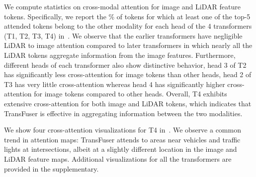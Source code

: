 We compute statistics on cross-modal attention for image and LiDAR feature tokens. Specifically, we report the \% of tokens for which at least one of the top-5 attended tokens belong to the other modality for each head of the 4 transformers (T1, T2, T3, T4) in~. We observe that the earlier transformers have negligible LiDAR to image attention compared to later transformers in which nearly all the LiDAR tokens aggregate information from the image features. Furthermore, different heads of each transformer also show distinctive behavior, \eg head 3 of T2 has significantly less cross-attention for image tokens than other heads, head 2 of T3 has very little cross-attention whereas head 4 has significantly higher cross-attention for image tokens compared to other heads. Overall, T4 exhibits extensive cross-attention for both image and LiDAR tokens, which indicates that TransFuser is effective in aggregating information between the two modalities.

We show four cross-attention visualizations for T4 in~. We observe a common trend in attention maps: TransFuser attends to areas near vehicles and traffic lights at intersections, albeit at a slightly different location in the image and LiDAR feature maps. Additional visualizations for all the transformers are provided in the supplementary.

